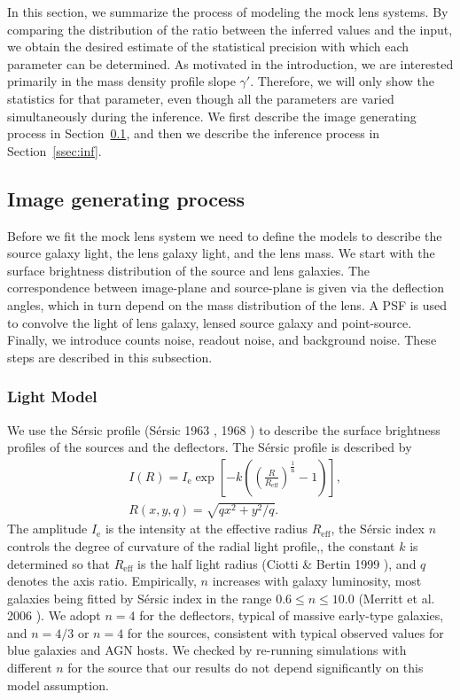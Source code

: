 \documentclass[a4paper,11pt]{article}
\begin{document}
In this section, we summarize the process of modeling the mock lens
systems. By comparing the distribution of the ratio between the
inferred values and the input, we obtain the desired estimate of the
statistical precision with which each parameter can be determined. As
motivated in the introduction, we are interested primarily in the mass
density profile slope $\gamma'$. Therefore, we will only show the
statistics for that parameter, even though all the parameters are
varied simultaneously during the inference. We first describe the
image generating process in Section~\ref{ssec:image}, and then we
describe the inference process in Section~\ref{ssec:inf}.

\subsection{Image generating process}
\label{ssec:image}

Before we fit the mock lens system we need to define the models to
describe the source galaxy light, the lens galaxy light, and the lens
mass. We start with the surface brightness distribution of the
source and lens galaxies. The correspondence between image-plane and source-plane
 is given via the deflection angles, which in turn depend on the mass distribution of the lens.
 A PSF is used to convolve the light of lens galaxy, lensed source galaxy and point-source.
 Finally, we introduce counts noise, readout noise, and background noise.
 These steps are described in this subsection.

\subsubsection{Light Model}

We use the S\'ersic profile (S{\'e}rsic 1963 \cite{1963BAAA....6...41S}, 1968 \cite{1968adga.book.....S})
to describe the surface brightness profiles of the sources and the deflectors. The
S\'ersic profile is described by %
%
\begin{eqnarray}
   \label{eq:Intensity}
   &I(R) = I_{\mathrm{e}} \exp\left[-k\left(\left(\frac{R}{R_{\mathrm{eff}}}\right)^{\frac{1}{\mathrm{n}}}-1\right)\right] ,\\
   &R(x,y,q) = \sqrt{qx^2+y^2/q}.
\end{eqnarray}
%
The amplitude $I_{\mathrm{e}}$ is the intensity at the effective
radius $R_{\mathrm{eff}}$, the S\'ersic index $n$ controls the degree
of curvature of the radial light profile,, the constant $k$ is determined so that
$R_{\mathrm{eff}}$ is the half light radius (Ciotti \& Bertin 1999 \cite{1999A&A...352..447C}),
 and $q$ denotes the axis ratio. Empirically, $n$ increases with galaxy luminosity, most
galaxies being fitted by S\'ersic index in the range $0.6 \le n
\le 10.0$ (Merritt et al. 2006 \cite{2006AJ....132.2685M}). We adopt $n=4$ for the
deflectors, typical of massive early-type galaxies, and $n=4/3$ or
$n=4$ for the sources, consistent with typical observed values for
blue galaxies and AGN hosts. We checked by re-running simulations with
different $n$ for the source that our results do not depend
significantly on this model assumption.
\end{document}
